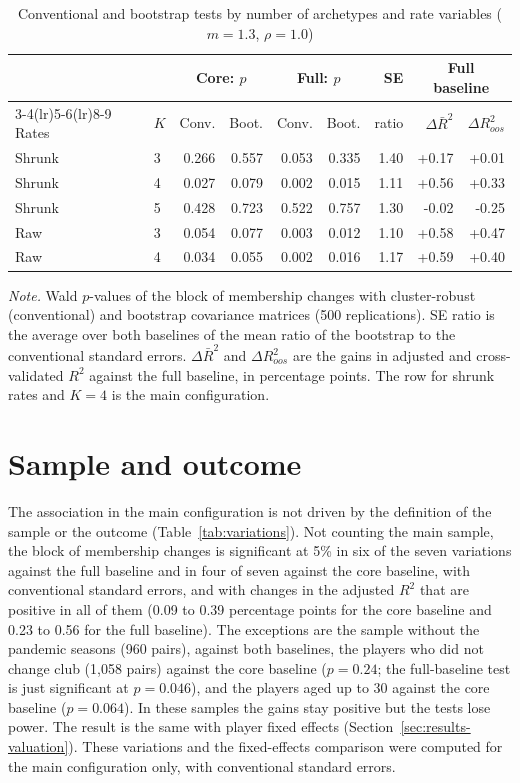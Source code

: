 \begin{table}[ht]
	\centering
	\small
	\caption{Conventional and bootstrap tests by number of archetypes and rate variables ($m=1.3$, $\rho=1.0$)}
	\label{tab:bootstrap-K}
	\begin{tabular}{llrrrrrrr}
		\toprule
		 & & \multicolumn{2}{c}{Core: $p$} & \multicolumn{2}{c}{Full: $p$} & SE & \multicolumn{2}{c}{Full baseline} \\
		\cmidrule(lr){3-4}\cmidrule(lr){5-6}\cmidrule(lr){8-9}
		Rates & $K$ & Conv. & Boot. & Conv. & Boot. & ratio & $\Delta\bar R^2$ & $\Delta R^2_{oos}$ \\
		\midrule
Shrunk & 3 & 0.266 & 0.557 & 0.053 & 0.335 & 1.40 & +0.17 & +0.01 \\
Shrunk & 4 & 0.027 & 0.079 & 0.002 & 0.015 & 1.11 & +0.56 & +0.33 \\
Shrunk & 5 & 0.428 & 0.723 & 0.522 & 0.757 & 1.30 & -0.02 & -0.25 \\
Raw & 3 & 0.054 & 0.077 & 0.003 & 0.012 & 1.10 & +0.58 & +0.47 \\
Raw & 4 & 0.034 & 0.055 & 0.002 & 0.016 & 1.17 & +0.59 & +0.40 \\
		\bottomrule
	\end{tabular}
	\par\smallskip
	\parbox{0.95\textwidth}{\footnotesize\emph{Note.} Wald $p$-values of the block of membership changes with cluster-robust (conventional) and bootstrap covariance matrices (500 replications). SE ratio is the average over both baselines of the mean ratio of the bootstrap to the conventional standard errors. $\Delta\bar R^2$ and $\Delta R^2_{oos}$ are the gains in adjusted and cross-validated $R^2$ against the full baseline, in percentage points. The row for shrunk rates and $K=4$ is the main configuration.}
\end{table}

\section{Sample and outcome}
\label{sec:rob-sample}

The association in the main configuration is not driven by the definition of the sample or the outcome (Table~\ref{tab:variations}). Not counting the main sample, the block of membership changes is significant at 5\% in six of the seven variations against the full baseline and in four of seven against the core baseline, with conventional standard errors, and with changes in the adjusted $R^2$ that are positive in all of them (0.09 to 0.39 percentage points for the core baseline and 0.23 to 0.56 for the full baseline). The exceptions are the sample without the pandemic seasons (960 pairs), against both baselines, the players who did not change club (1,058 pairs) against the core baseline ($p=0.24$; the full-baseline test is just significant at $p=0.046$), and the players aged up to 30 against the core baseline ($p=0.064$). In these samples the gains stay positive but the tests lose power. The result is the same with player fixed effects (Section~\ref{sec:results-valuation}). These variations and the fixed-effects comparison were computed for the main configuration only, with conventional standard errors.


